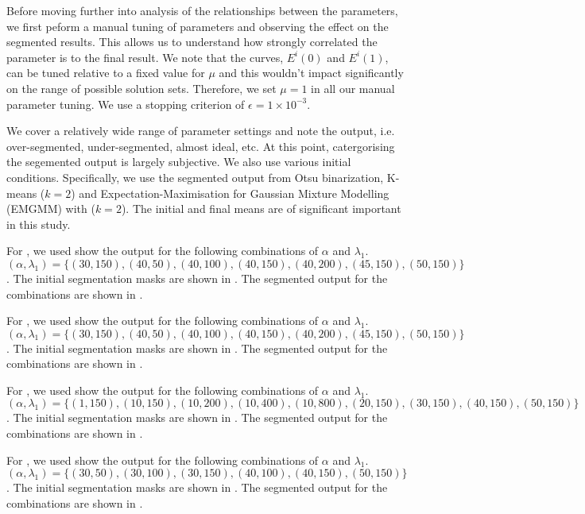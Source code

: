 \begin{definition} Before moving further into analysis of the relationships between the parameters, we first peform a manual tuning of parameters and observing the effect on the segmented results. This allows us to understand how strongly correlated the parameter is to the final result. We note that the curves, $E^i(0)$ and $E^i(1)$, can be tuned relative to a fixed value for $\mu$ and this wouldn't impact significantly on the range of possible solution sets. Therefore, we set $\mu=1$ in all our manual parameter tuning. We use a stopping criterion of $\epsilon=1\times10^{-3}$.
	
We cover a relatively wide range of parameter settings and note the output, i.e. over-segmented, under-segmented, almost ideal, etc. At this point, catergorising the segemented output is largely subjective. We also use various initial conditions. Specifically, we use the segmented output from Otsu binarization, K-means ($k=2$) and Expectation-Maximisation for Gaussian Mixture Modelling (EMGMM) with ($k=2$). The initial and final means are of significant important in this study.

For , we used show the output for the following combinations of $\alpha$ and $\lambda_1$. $(\alpha,\lambda_1) = \{(30,150), (40,50), (40,100), (40,150), (40,200), (45,150), (50,150)\}$. The initial segmentation masks are shown in . The segmented output for the combinations are shown in .

For , we used show the output for the following combinations of $\alpha$ and $\lambda_1$. $(\alpha,\lambda_1) = \{(30,150), (40,50), (40,100), (40,150), (40,200), (45,150), (50,150)\}$. The initial segmentation masks are shown in . The segmented output for the combinations are shown in .

For , we used show the output for the following combinations of $\alpha$ and $\lambda_1$. $(\alpha,\lambda_1) = \{(1,150), (10,150), (10,200), (10,400), (10,800), (20,150), (30,150), (40,150), (50,150)\}$. The initial segmentation masks are shown in . The segmented output for the combinations are shown in .

For , we used show the output for the following combinations of $\alpha$ and $\lambda_1$. $(\alpha,\lambda_1) = \{(30,50), (30,100), (30,150), (40,100), (40,150), (50,150)\}$. The initial segmentation masks are shown in . The segmented output for the combinations are shown in .


\end{definition}
